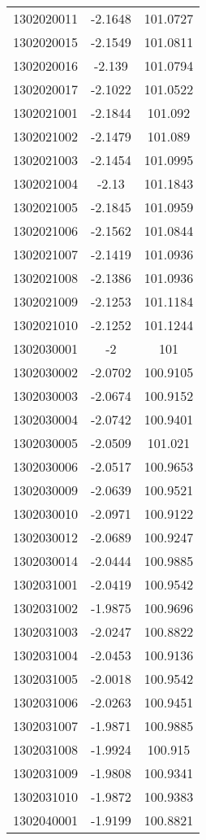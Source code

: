 \begin{longtable}{@{}lcc@{}}
1302020011 & -2.1648 & 101.0727\\ 
1302020015 & -2.1549 & 101.0811\\ 
1302020016 & -2.139 & 101.0794\\ 
1302020017 & -2.1022 & 101.0522\\ 
1302021001 & -2.1844 & 101.092\\ 
1302021002 & -2.1479 & 101.089\\ 
1302021003 & -2.1454 & 101.0995\\ 
1302021004 & -2.13 & 101.1843\\ 
1302021005 & -2.1845 & 101.0959\\ 
1302021006 & -2.1562 & 101.0844\\ 
1302021007 & -2.1419 & 101.0936\\ 
1302021008 & -2.1386 & 101.0936\\ 
1302021009 & -2.1253 & 101.1184\\ 
1302021010 & -2.1252 & 101.1244\\ 
1302030001 & -2 & 101\\ 
1302030002 & -2.0702 & 100.9105\\ 
1302030003 & -2.0674 & 100.9152\\ 
1302030004 & -2.0742 & 100.9401\\ 
1302030005 & -2.0509 & 101.021\\ 
1302030006 & -2.0517 & 100.9653\\ 
1302030009 & -2.0639 & 100.9521\\ 
1302030010 & -2.0971 & 100.9122\\ 
1302030012 & -2.0689 & 100.9247\\ 
1302030014 & -2.0444 & 100.9885\\ 
1302031001 & -2.0419 & 100.9542\\ 
1302031002 & -1.9875 & 100.9696\\ 
1302031003 & -2.0247 & 100.8822\\ 
1302031004 & -2.0453 & 100.9136\\ 
1302031005 & -2.0018 & 100.9542\\ 
1302031006 & -2.0263 & 100.9451\\ 
1302031007 & -1.9871 & 100.9885\\ 
1302031008 & -1.9924 & 100.915\\ 
1302031009 & -1.9808 & 100.9341\\ 
1302031010 & -1.9872 & 100.9383\\ 
1302040001 & -1.9199 & 100.8821\\ 

\end{longtable}

